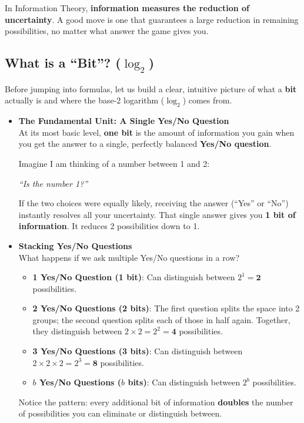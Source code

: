\documentclass[11pt,a4paper]{article}
\begin{document}
In Information Theory, \textbf{information measures the reduction of uncertainty}. A good move is one that guarantees a large reduction in remaining possibilities, no matter what answer the game gives you.

\subsection{\texorpdfstring{What is a ``Bit''? ($\log_2$)}{What is a Bit?}}
Before jumping into formulas, let us build a clear, intuitive picture of what a \textbf{bit} actually is and where the base-2 logarithm ($\log_2$) comes from.

\begin{itemize}[leftmargin=1.5em, itemsep=12pt]
    \item \textbf{The Fundamental Unit: A Single Yes/No Question} \\
    At its most basic level, \textbf{one bit} is the amount of information you gain when you get the answer to a single, perfectly balanced \textbf{Yes/No question}.
    
    Imagine I am thinking of a number between 1 and 2:
    \begin{center}
    \textit{``Is the number 1?''}
    \end{center}
    If the two choices were equally likely, receiving the answer (``Yes'' or ``No'') instantly resolves all your uncertainty. That single answer gives you \textbf{1 bit of information}. It reduces 2 possibilities down to 1.

    \item \textbf{Stacking Yes/No Questions} \\
    What happens if we ask multiple Yes/No questions in a row?
    \begin{itemize}[itemsep=3pt]
        \item \textbf{1 Yes/No Question (1 bit)}: Can distinguish between $2^1 = \textbf{2}$ possibilities.
        \item \textbf{2 Yes/No Questions (2 bits)}: The first question splits the space into 2 groups; the second question splits each of those in half again. Together, they distinguish between $2 \times 2 = 2^2 = \textbf{4}$ possibilities.
        \item \textbf{3 Yes/No Questions (3 bits)}: Can distinguish between $2 \times 2 \times 2 = 2^3 = \textbf{8}$ possibilities.
        \item \textbf{$b$ Yes/No Questions ($b$ bits)}: Can distinguish between $2^b$ possibilities.
    \end{itemize}
    Notice the pattern: every additional bit of information \textbf{doubles} the number of possibilities you can eliminate or distinguish between.


\end{itemize}
\end{document}
